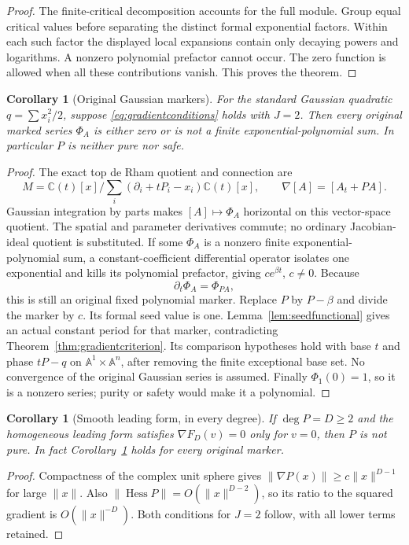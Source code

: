 \documentclass[11pt]{article}
\newtheorem{corollary}[theorem]{Corollary}
\theoremstyle{definition}\newtheorem{definition}[theorem]{Definition}
\theoremstyle{remark}\newtheorem{remark}[theorem]{Remark}
\newcommand{\C}{\mathbb C}
\begin{document}
\begin{proof}
The finite-critical decomposition accounts for the full module.
Group equal critical values before separating the distinct formal
exponential factors. Within each such factor the displayed local
expansions contain only decaying powers and logarithms. A nonzero
polynomial prefactor cannot occur. The zero function is allowed when
all these contributions vanish. This proves the theorem.
\end{proof}

\begin{corollary}[Original Gaussian markers]\label{cor:gradientmarkers}
For the standard Gaussian quadratic $q=\sum x_i^2/2$, suppose
\eqref{eq:gradientconditions} holds with $J=2$. Then every original
marked series $\Phi_A$ is either zero or is not a finite
exponential-polynomial sum. In particular $P$ is neither pure nor safe.
\end{corollary}
\begin{proof}
The exact top de Rham quotient and connection are
\[
 M=\C(t)[x]\Big/\sum_i(\partial_i+tP_i-x_i)\C(t)[x],
 \qquad\nabla[A]=[A_t+PA].
\]
Gaussian integration by parts makes $[A]\mapsto\Phi_A$ horizontal
on this vector-space quotient. The spatial and parameter derivatives
commute; no ordinary Jacobian-ideal quotient is substituted.
If some $\Phi_A$ is a
nonzero finite exponential-polynomial sum, a constant-coefficient
differential operator isolates one exponential and kills its
polynomial prefactor, giving $c e^{\beta t}$, $c\ne0$.
Because
\[
 \partial_t\Phi_A=\Phi_{PA},
\]
this is still an original fixed polynomial marker. Replace $P$ by
$P-\beta$ and divide the marker by $c$. Its formal seed value is one.
Lemma~\ref{lem:seedfunctional} gives an actual constant period for
that marker, contradicting Theorem~\ref{thm:gradientcriterion}.
Its comparison hypotheses hold with base $t$ and phase $tP-q$ on
$\mathbb A^1\times\mathbb A^n$, after removing the finite exceptional
base set. No convergence of the original Gaussian series is assumed.
Finally $\Phi_1(0)=1$, so it is a nonzero series; purity or safety
would make it a polynomial.
\end{proof}

\begin{corollary}[Smooth leading form, in every degree]
\label{cor:smoothleading}
If $\deg P=D\geq2$ and the homogeneous leading form satisfies
$\nabla F_D(v)=0$ only for $v=0$, then $P$ is not pure. In fact
Corollary~\ref{cor:gradientmarkers} holds for every original marker.
\end{corollary}
\begin{proof}
Compactness of the complex unit sphere gives
$\|\nabla P(x)\|\geq c\|x\|^{D-1}$ for large $\|x\|$.
Also $\|\operatorname{Hess}P\|=O(\|x\|^{D-2})$, so its ratio to
the squared gradient is $O(\|x\|^{-D})$. Both conditions for $J=2$
follow, with all lower terms retained.
\end{proof}
\end{document}
